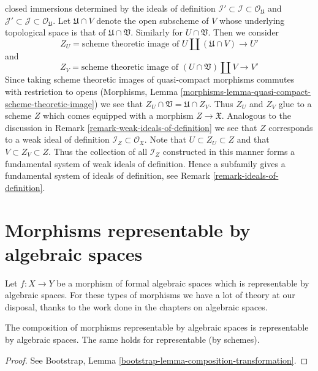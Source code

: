 \begin{remark}
closed immersions determined by the ideals of definition
$\mathcal{I}' \subset \mathcal{I} \subset \mathcal{O}_\mathfrak U$
and
$\mathcal{J}' \subset \mathcal{J} \subset \mathcal{O}_\mathfrak U$.
Let $\mathfrak U \cap V$ denote the open subscheme of $V$ whose
underlying topological space is that of $\mathfrak U \cap \mathfrak V$.
Similarly for $U \cap \mathfrak V$. Then we consider
$$
Z_U = \text{scheme theoretic image of }
U \amalg (\mathfrak U \cap V) \longrightarrow U'
$$
and
$$
Z_V = \text{scheme theoretic image of }
(U \cap \mathfrak V) \amalg V \longrightarrow V'
$$
Since taking scheme theoretic images of quasi-compact morphisms
commutes with restriction to opens (Morphisms, Lemma
\ref{morphisms-lemma-quasi-compact-scheme-theoretic-image})
we see that $Z_U \cap \mathfrak V = \mathfrak U \cap Z_V$.
Thus $Z_U$ and $Z_V$ glue to a scheme $Z$ which comes equipped
with a morphism $Z \to \mathfrak X$. Analogous to the discussion in
Remark \ref{remark-weak-ideals-of-definition}
we see that $Z$ corresponds to a weak ideal
of definition $\mathcal{I}_Z \subset \mathcal{O}_\mathfrak X$.
Note that $U \subset Z_U \subset Z$ and that
$V \subset Z_V \subset Z$. Thus the collection of all $\mathcal{I}_Z$
constructed in this manner forms a fundamental system of weak
ideals of definition. Hence a subfamily gives a fundamental system of ideals
of definition, see Remark \ref{remark-ideals-of-definition}.
\end{remark}






\section{Morphisms representable by algebraic spaces}
\label{section-representable}

\noindent
Let $f : X \to Y$ be a morphism of formal algebraic spaces which
is representable by algebraic spaces. For these types of morphisms
we have a lot of theory at our disposal, thanks to the work done
in the chapters on algebraic spaces.

\begin{lemma}
\label{lemma-composition-representable}
The composition of morphisms representable by algebraic spaces is
representable by algebraic spaces. The same holds for representable
(by schemes).
\end{lemma}

\begin{proof}
See Bootstrap, Lemma \ref{bootstrap-lemma-composition-transformation}.
\end{proof}

